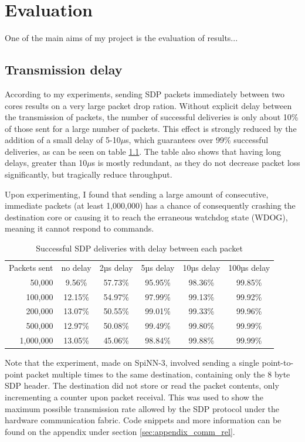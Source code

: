 \chapter{Evaluation}
\label{cha:eval}
One of the main aims of my project is the evaluation of results...

\section{Transmission delay}
\label{sec:eval_comm_rel}

According to my experiments, sending SDP packets immediately between two cores results on a very large packet drop ration. Without explicit delay between the transmission of packets, the number of successful deliveries is only about 10\% of those sent for a large number of packets. This effect is strongly reduced by the addition of a small delay of 5-10$\mu$s, which guarantees over 99\% successful deliveries, as can be seen on table \ref{table:sdp_deliveries}. The table also shows that having long delays, greater than 10$\mu$s is mostly redundant, as they do not decrease packet loss significantly, but tragically reduce throughput.

Upon experimenting, I found that sending a large amount of consecutive, immediate packets (at least 1,000,000) has a chance of consequently crashing the destination core or causing it to reach the erraneous watchdog state (WDOG), meaning it cannot respond to commands.

\begin{table}
\begin{tabular}{ r | c | c | c | c | c }
Packets sent & no delay & 2µs delay & 5µs delay & 10µs delay & 100µs delay \\
50,000 & 9.56\% & 57.73\% & 95.95\% & 98.36\% & 99.85\% \\
100,000 & 12.15\% & 54.97\% & 97.99\% & 99.13\% & 99.92\% \\
200,000 & 13.07\% & 50.55\% & 99.01\% & 99.33\% & 99.96\% \\
500,000 & 12.97\% & 50.08\% & 99.49\% & 99.80\% & 99.99\% \\
1,000,000 & 13.05\% & 45.06\% & 98.84\% & 99.88\% & 99.99\% \\
\end{tabular}
\caption{Successful SDP deliveries with delay between each packet}
\label{table:sdp_deliveries}
\end{table}

Note that the experiment, made on SpiNN-3, involved sending a single point-to-point packet multiple times to the same destination, containing only the 8 byte SDP header. The destination did not store or read the packet contents, only incrementing a counter upon packet receival. This was used to show the maximum possible transmission rate allowed by the SDP protocol under the hardware communication fabric. Code snippets and more information can be found on the appendix under section \ref{sec:appendix_comm_rel}.

